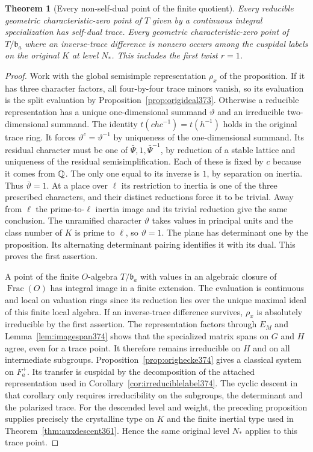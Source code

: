\documentclass[a4paper,11pt]{article}
\newtheorem{theorem}[proposition]{Theorem}
\theoremstyle{definition}
\theoremstyle{remark}
\numberwithin{equation}{section}
\begin{document}
\begin{theorem}[Every non-self-dual point of the finite quotient]
\label{thm:alllabels375}
Every reducible geometric characteristic-zero point of \(T\)
given by a continuous integral specialization has self-dual
trace. Every geometric characteristic-zero point of
\(T/\mathfrak b_a\) where an inverse-trace difference is
nonzero occurs among the cuspidal labels on the original
\(K\) at level \(N_*\). This includes the first twist \(r=1\).
\end{theorem}
\begin{proof}
Work with the global semisimple representation \(\rho_x\)
of the proposition. If it has three character factors,
all four-by-four trace minors vanish, so its evaluation
is the split evaluation by Proposition~\ref{prop:origideal373}.
Otherwise a reducible representation has a unique
one-dimensional summand \(\vartheta\) and an irreducible
two-dimensional summand. The identity
\(t(chc^{-1})=t(h^{-1})\) holds in the original trace ring.
It forces \(\vartheta^c=\vartheta^{-1}\) by uniqueness
of the one-dimensional summand. Its residual character must
be one of \(\bar\Psi,1,\bar\Psi^{-1}\), by reduction of a
stable lattice and uniqueness of the residual semisimplification.
Each of these is fixed by \(c\) because it comes from \(\mathbb Q\).
The only one equal to its inverse is \(1\), by separation
on inertia. Thus \(\bar\vartheta=1\). At a place over
\(\ell\) its restriction to inertia is one of the three
prescribed characters, and their distinct reductions force
it to be trivial. Away from \(\ell\) the prime-to-\(\ell\)
inertia image and its trivial reduction give the same
conclusion. The unramified character \(\vartheta\) takes
values in principal units and the class number of \(K\)
is prime to \(\ell\), so \(\vartheta=1\). The plane has
determinant one by the proposition. Its alternating
determinant pairing identifies it with its dual. This
proves the first assertion.

A point of the finite \(O\)-algebra \(T/\mathfrak b_a\) with
values in an algebraic closure of \(\operatorname{Frac}(O)\)
has integral image in a finite extension. The evaluation
is continuous and local on valuation rings since its
reduction lies over the unique maximal ideal of this
finite local algebra. If an inverse-trace difference
survives, \(\rho_x\) is absolutely irreducible by the first
assertion. The representation factors through \(E_M\) and
Lemma~\ref{lem:imagespan374} shows that the specialized
matrix spans on \(G\) and \(H\) agree, even for a trace
point. It therefore remains irreducible on \(H\) and on
all intermediate subgroups. Proposition~\ref{prop:orighecke374}
gives a classical system on \(F_a^+\). Its transfer is
cuspidal by the decomposition of the attached representation
used in Corollary~\ref{cor:irreduciblelabel374}. The cyclic
descent in that corollary only requires irreducibility on
the subgroups, the determinant and the polarized trace.
For the descended level and weight, the preceding proposition
supplies precisely the crystalline type on \(K\) and the
finite inertial type used in
Theorem~\ref{thm:auxdescent361}. Hence the same original
level \(N_*\) applies to this trace point.
\end{proof}
\end{document}
